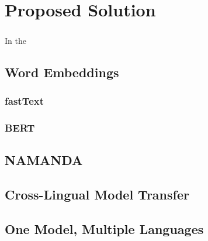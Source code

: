 \chapter{Proposed Solution}
\label{chpt:5}

\paragraph{}
In the 

\section{Word Embeddings}
\label{sec:w_e}
\subsection{fastText}

\subsection{BERT}

\section{NAMANDA}


\section{Cross-Lingual Model Transfer}


\section{One Model, Multiple Languages}
